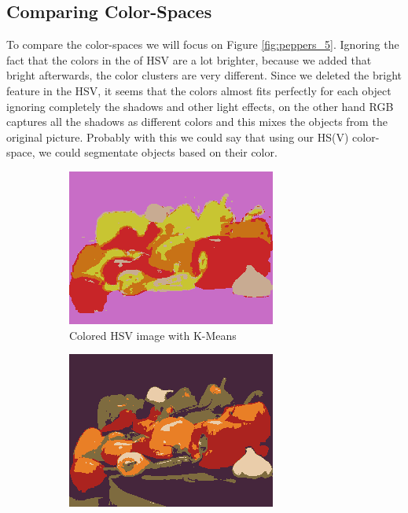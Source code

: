 \documentclass[sigconf,authorversion]{acmart}
\begin{document}
\subsection{Comparing Color-Spaces}
To compare the color-spaces we will focus on Figure \ref{fig:peppers_5}. Ignoring the fact that the colors in the of HSV are a lot brighter, because we added that bright afterwards, the color clusters are very different. Since we deleted the bright feature in the HSV, it seems that the colors almost fits perfectly for each object ignoring completely the shadows and other light effects, on the other hand RGB captures all the shadows as different colors and this mixes the objects from the original picture. Probably with this we could say that using our HS(V) color-space, we could segmentate objects based on their color.
\begin{figure}[hbtp]
  \begin{subfigure}[b]{0.45\columnwidth}
      \includegraphics[width=\columnwidth]{../outputs/peppers2_5_hsv_colored_kmeans.png}
      \caption{Colored HSV image with K-Means}
      \label{subfig:peppers_hsv_kmeans}
  \end{subfigure}
  \hspace{0.05\columnwidth}
  \begin{subfigure}[b]{0.45\columnwidth}
      \includegraphics[width=\columnwidth]{../outputs/peppers2_5_rgb_colored_kmeans.png}

\end{subfigure}
\end{figure}
\end{document}
